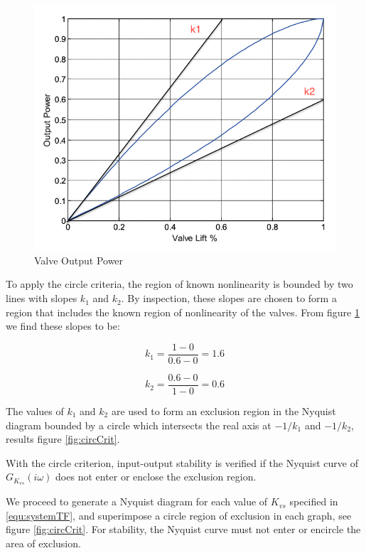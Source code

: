 \documentclass[a4paper, titlepage]{article}
\begin{document}
\begin{figure}[h!]
\center
\includegraphics[scale=0.25]{../figures/valveOutputPower.png}
\caption{Valve Output Power}
\label{fig:valvepower}
\end{figure}

To apply the circle criteria, the region of known nonlinearity is bounded by two lines with slopes $k_{1}$ and $k_{2}$.  By inspection, these slopes are chosen to form a region that includes the known region of nonlinearity of the valves.  From figure \ref{fig:valvepower} we find these slopes to be:

\begin{equation}
k_{1} = \frac{1-0}{0.6-0} = 1.6
\label{equ:k1_value}
\end{equation}

\begin{equation}
k_{2} = \frac{0.6-0}{1-0} = 0.6
\label{equ:k2_value}
\end{equation}

The values of $k_{1}$ and $k_{2}$ are used to form an exclusion region in the Nyquist diagram bounded by a circle which intersects the real axis at $-1/k_{1}$ and $-1/k_{2}$, results figure \ref{fig:circCrit}.

With the circle criterion, input-output stability is verified if the Nyquist curve of $G_{K_{vs}}(i\omega)$ does not enter or enclose the exclusion region.

We proceed to generate a Nyquist diagram for each value of $K_{vs}$ specified in \ref{equ:systemTF}, and superimpose a circle region of exclusion in each graph, see figure \ref{fig:circCrit}.
For stability, the Nyquist curve must not enter or encircle the area of exclusion.
\end{document}
